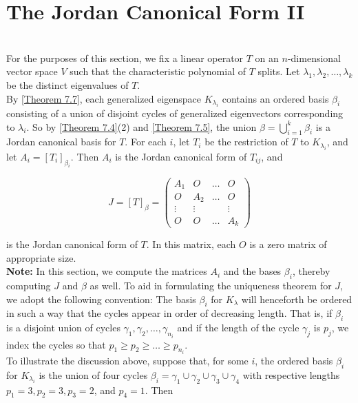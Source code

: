 \section{The Jordan Canonical Form II}

\begin{definition}
	\hfill\\
	For the purposes of this section, we fix a linear operator $T$ on an $n$-dimensional vector space $V$ such that the characteristic polynomial of $T$ splits. Let $\lambda_1, \lambda_2, \dots, \lambda_k$ be the distinct eigenvalues of $T$.\\

	By \autoref{Theorem 7.7}, each generalized eigenspace $K_{\lambda_i}$ contains an ordered basis $\beta_i$ consisting of a union of disjoint cycles of generalized eigenvectors corresponding to $\lambda_i$. So by \autoref{Theorem 7.4}(2) and \autoref{Theorem 7.5}, the union $\beta = \displaystyle\bigcup_{i=1}^k \beta_i$ is a Jordan canonical basis for $T$. For each $i$, let $T_i$ be the restriction of $T$ to $K_{\lambda_i}$, and let $A_i = [T_i]_{\beta_i}$. Then $A_i$ is the Jordan canonical form of $T_{ij}$, and

	\[J = [T]_\beta = \begin{pmatrix}
			A_1    & O      & \dots & O      \\
			O      & A_2    & \dots & O      \\
			\vdots & \vdots &       & \vdots \\
			O      & O      & \dots & A_k
		\end{pmatrix}\]

	is the Jordan canonical form of $T$. In this matrix, each $O$ is a zero matrix of appropriate size.\\

	\textbf{Note:} In this section, we compute the matrices $A_i$ and the bases $\beta_i$, thereby computing $J$ and $\beta$ as well. To aid in formulating the uniqueness theorem for $J$, we adopt the following convention: The basis $\beta_i$ for $K_\lambda$ will henceforth be ordered in such a way that the cycles appear in order of decreasing length. That is, if $\beta_i$ is a disjoint union of cycles $\gamma_1, \gamma_2, \dots, \gamma_{n_i}$ and if the length of the cycle $\gamma_j$ is $p_j$, we index the cycles so that $p_1 \geq p_2 \geq \dots \geq p_{n_i}$.\\

	To illustrate the discussion above, suppose that, for some $i$, the ordered basis $\beta_i$ for $K_{\lambda_i}$ is the union of four cycles $\beta_i = \gamma_1 \cup \gamma_2 \cup \gamma_3 \cup \gamma_4$ with respective lengths $p_1 = 3, p_2 = 3, p_3 = 2$, and $p_4 = 1$. Then


\end{definition}
